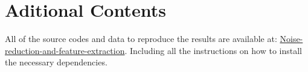 \chapter{Aditional Contents}

All of the source codes and data to reproduce the results are 
available at: \href{https://github.com/Tomas-Barhon/Noise-reduction-and-feature-extraction-with-principal-component-analysis}{Noise-reduction-and-feature-extraction}. 
Including all the instructions on how to install the necessary dependencies.

